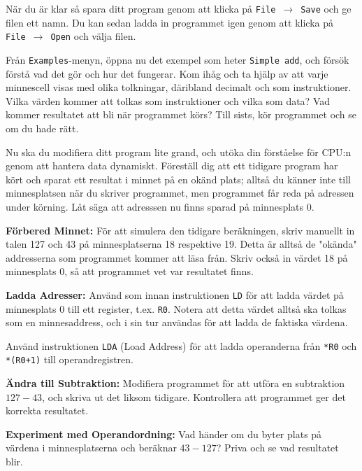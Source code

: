 \begin{Datorarbete}
    \noindent När du är klar så spara ditt program genom att klicka på \texttt{File}~$\rightarrow$~\texttt{Save} och ge filen ett namn. Du kan sedan ladda in programmet igen genom att klicka på \texttt{File}~$\rightarrow$~\texttt{Open} och välja filen.
    \vspace{-2mm}

    \item {} Från \texttt{Examples}-menyn, öppna nu det exempel som heter \texttt{Simple~add}, och försök förstå vad det gör och hur det fungerar. Kom ihåg och ta hjälp av att varje minnescell visas med olika tolkningar, däribland decimalt och som instruktioner. Vilka värden kommer att tolkas som instruktioner och vilka som data? Vad kommer resultatet att bli när programmet körs? Till sists, kör programmet och se om du hade rätt.
    
    \item {} Nu ska du modifiera ditt program lite grand, och utöka din förståelse för CPU:n genom att hantera data dynamiskt. Föreställ dig att ett tidigare program har kört och sparat ett resultat i minnet på en okänd plats; alltså du känner inte till minnesplatsen när du skriver programmet, men programmet får reda på adressen under körning. Låt säga att adresssen nu finns sparad på minnesplats 0.

    \begin{Deluppgifter}
        \item \textbf{Förbered Minnet:} För att simulera den tidigare beräkningen, skriv manuellt in talen 127 och 43 på minnesplatserna 18 respektive 19. Detta är alltså de "okända" addresserna som programmet kommer att läsa från. Skriv också in värdet 18 på minnesplats 0, så att programmet vet var resultatet finns.
        \item \textbf{Ladda Adresser:} Använd som innan instruktionen \texttt{LD} för att ladda värdet på minnesplats 0 till ett register, t.ex. \texttt{R0}. Notera att detta värdet alltså ska tolkas som en minnesaddress, och i sin tur användas för att ladda de faktiska värdena.
        \item Använd instruktionen \texttt{LDA} (Load Address) för att ladda operanderna från \texttt{*R0} och \texttt{*(R0+1)} till operandregistren.
        \item \textbf{Ändra till Subtraktion:} Modifiera programmet för att utföra en subtraktion \(127-43\), och skriva ut det liksom tidigare. Kontrollera att programmet ger det korrekta resultatet.
        \item \textbf{Experiment med Operandordning:} Vad händer om du byter plats på värdena i minnesplatserna och beräknar \(43-127\)? Priva och se vad resultatet blir.
    \end{Deluppgifter}


\end{Datorarbete}
